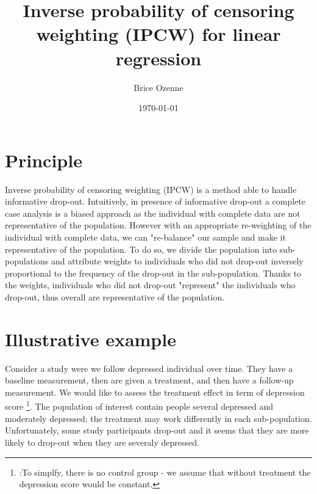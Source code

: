 \documentclass[12pt]{article}
\author{Brice Ozenne}
\date{\today}
\title{Inverse probability of censoring weighting (IPCW) for linear regression}
\begin{document}
\maketitle

\section{Principle}
\label{sec:orgfe35a06}

Inverse probability of censoring weighting (IPCW) is a method able to
handle informative drop-out. Intuitively, in presence of informative
drop-out a complete case analysis is a biased approach as the
individual with complete data are not representative of the
population. However with an appropriate re-weighting of the individual
with complete data, we can "re-balance" our sample and make it
representative of the population. To do so, we divide the population
into sub-populations and attribute weights to individuals who did not
drop-out inversely proportional to the frequency of the drop-out in
the sub-population. Thanks to the weights, individuals who did not
drop-out "represent" the individuals who drop-out, thus overall are
representative of the population.

\section{Illustrative example}
\label{sec:org8796ac7}

Consider a study were we follow depressed
individual over time. They have a baseline measurement, then are given
a treatment, and then have a follow-up measurement. We would like to
assess the treatment effect in term of depression score \footnote{:To
simplfy, there is no control group - we assume that without treatment
the depression score would be constant.}. The population of interest
contain people several depressed and moderately depressed; the
treatment may work differently in each sub-population. Unfortunately,
some study participants drop-out and it seems that they are more
likely to drop-out when they are severaly depressed.

\clearpage
\end{document}
